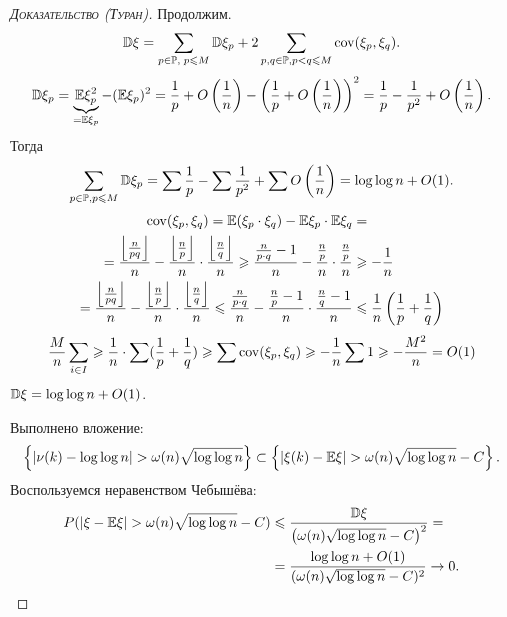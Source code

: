 \documentclass[../main.tex]{subfiles}
\begin{document}
\begin{proof}[\normalfont\textsc{Доказательство (Туран)}]
 Продолжим.
 \begin{align*}
  \mathbb D\xi = \sum_{p \in \mathbb P,\; p \leqslant M} \mathbb D\xi_p + 2 \sum_{p,q \in \mathbb P,p < q \leqslant M} \mathrm{cov}(\xi_p,\xi_q).
 \end{align*}
 \begin{align*}
	 \mathbb D\xi_p = \underbrace{\mathbb E\xi_p^{2}}_{=\mathbb E \xi_p} - (\mathbb E\xi_p)^{2} = \frac{1}{p} + O \left( \frac{1}{n} \right) - \left(\frac{1}{p} + O\left(\frac{1}{n}\right)\right)^{2} = \frac{1}{p} - \frac{1}{p^{2}} + O \left( \frac{1}{n} \right).
 \end{align*} Тогда
 \begin{align*}
  \sum_{p \in \mathbb P, p \leqslant M} \mathbb D\xi_p = \sum \frac{1}{p} - \sum \frac{1}{p^{2}} + \sum O \left( \frac{1}{n} \right) = \log\log n + O(1).
 \end{align*}
 \begin{align*}
	 \mathrm{cov}(\xi_p, \xi_q) = \mathbb E(\xi_p \cdot \xi_q) - \mathbb E\xi_p \cdot \mathbb E\xi_q &= \\
  = \frac{\left\lfloor \frac{n}{pq} \right\rfloor }{n} - \frac{\left\lfloor \frac{n}{p} \right\rfloor}{n} \cdot \frac{\left\lfloor \frac{n}{q} \right\rfloor }{n} \geqslant \frac{\frac{n}{p \cdot q} - 1}{n} - \frac{\frac{n}{p }}{n } \cdot \frac{\frac{n}{p }}{n} &\geqslant -\frac{1}{n} \\
  = \frac{\left\lfloor \frac{n}{pq} \right\rfloor }{n} - \frac{\left\lfloor \frac{n}{p} \right\rfloor}{n} \cdot \frac{\left\lfloor \frac{n}{q} \right\rfloor }{n} \leqslant \frac{\frac{n}{p \cdot q}}{n} - \frac{\frac{n}{p} - 1}{n} \cdot \frac{\frac{n}{q} - 1}{n} &\leqslant \frac{1}{n} \left(\frac{1}{p} + \frac{1}{q}\right)
 \end{align*} 
  \begin{align*}
   \frac{M}{n} \sum_{i \in I} \geqslant \frac{1}{n} \cdot \sum (\frac{1}{p} + \frac{1}{q}) \geqslant \sum \mathrm{cov}(\xi_p, \xi_q) \geqslant -\frac{1}{n} \sum 1 \geqslant -\frac{M^{2}}{n} = O(1)
  \end{align*} 
  $ \mathbb D\xi = \log\log n + O(1) $.

  Выполнено вложение:
  \begin{align*}
   \left\{\left| \nu(k) - \log\log n \right| > \omega(n) \sqrt{\log\log n} \right\} \subset \left\{ \left|\xi(k) - \mathbb E\xi \right| > \omega(n)\sqrt{\log\log n} - C \right\}.
  \end{align*} Воспользуемся неравенством Чебышёва:
  \begin{align*}
	P( \left| \xi - \mathbb E\xi \right| > \omega(n)\sqrt{\log\log n} - C) &\leqslant \frac{\mathbb D\xi}{\left( \omega(n)\sqrt{\log \log n} - C \right)^{2}} = \\
   &= \frac{\log\log n + O(1)}{(\omega(n)\sqrt{\log \log n} - C)^{2}} \to 0.
  \end{align*} 
\end{proof}
\end{document}
